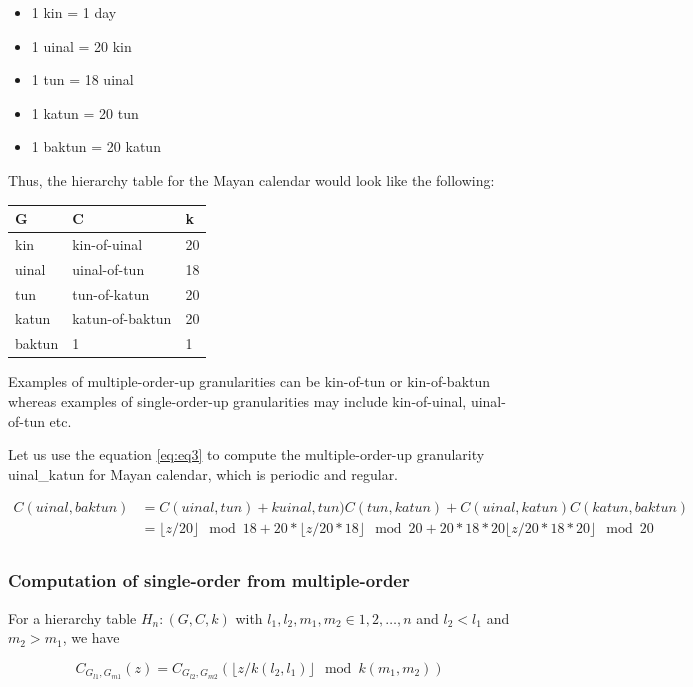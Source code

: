 \documentclass[12pt]{article}
\providecommand{\tightlist}{%
  \setlength{\itemsep}{0pt}\setlength{\parskip}{0pt}}
\begin{document}
\begin{itemize}
\tightlist
\item
  1 kin = 1 day
\item
  1 uinal = 20 kin
\item
  1 tun = 18 uinal
\item
  1 katun = 20 tun
\item
  1 baktun = 20 katun
\end{itemize}

Thus, the hierarchy table for the Mayan calendar would look like the
following:

\begin{longtable}[]{@{}lll@{}}
\toprule
G & C & k\tabularnewline
\midrule
\endhead
kin & kin-of-uinal & 20\tabularnewline
uinal & uinal-of-tun & 18\tabularnewline
tun & tun-of-katun & 20\tabularnewline
katun & katun-of-baktun & 20\tabularnewline
baktun & 1 & 1\tabularnewline
\bottomrule
\end{longtable}

Examples of multiple-order-up granularities can be kin-of-tun or
kin-of-baktun whereas examples of single-order-up granularities may
include kin-of-uinal, uinal-of-tun etc.

Let us use the equation \ref{eq:eq3} to compute the multiple-order-up
granularity uinal\_katun for Mayan calendar, which is periodic and
regular.

\begin{equation} \label{eq8}
\begin{split}
C(uinal, baktun) & = C(uinal, tun) + kuinal, tun)C(tun,katun) + C(uinal, katun)C(katun, baktun) \\
              & = \lfloor z/20\rfloor \mod 18  + 20*\lfloor z/20*18\rfloor \mod 20 + 20*18*20\lfloor z/20*18*20\rfloor \mod 20 \\
\end{split}
\end{equation}

\hypertarget{sec:singlefrommultiple}{%
\subsubsection{Computation of single-order from
multiple-order}\label{sec:singlefrommultiple}}

For a hierarchy table \(H_n: (G, C, k)\) with
\(l_1, l_2, m_1, m_2 \in {1, 2, \dots, n}\) and \(l_2<l_1\) and
\(m_2>m_1\), we have

\begin{equation} \label{eq9}
C_{G_{l1}, G_{m1}}(z) = C_{G_{l2}, G_{m2}}(\lfloor z/k(l_2,l_1) \rfloor\mod k(m_1, m_2))
\end{equation}
\end{document}
